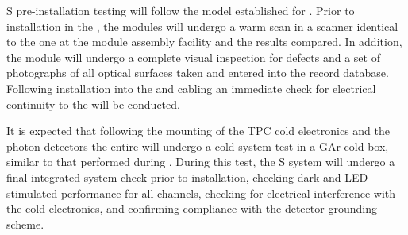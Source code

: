 S pre-installation testing will follow the model established for .  Prior to installation in the , the  modules will undergo a warm scan in a scanner identical to the one at the  module assembly facility and the results compared.  In addition, the module will undergo a complete visual inspection for defects and a set of photographs of all optical surfaces taken and entered into the  record database.  Following installation into the  and cabling an immediate check for electrical continuity to the  will be conducted.

It is expected that following the mounting of the TPC cold electronics and the photon detectors the entire  will undergo a cold system test in a GAr cold box, similar to that performed during .  During this test, the S system will undergo a final integrated system check prior to installation, checking dark and LED-stimulated  performance for all channels, checking for electrical interference with the cold electronics, and confirming compliance with the detector grounding scheme.
